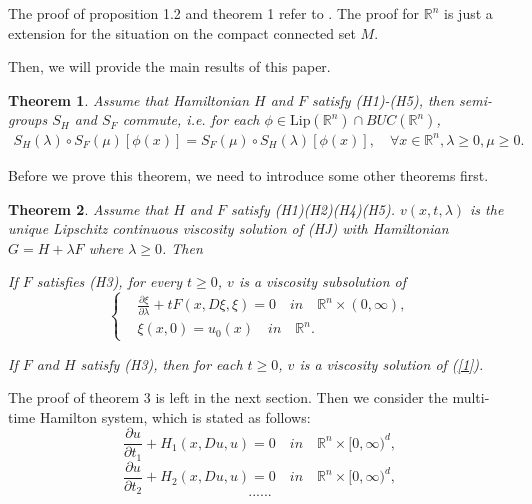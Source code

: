 \documentclass[preprint]{elsarticle}
\newtheorem{result}{\textbf{Theorem}}
\numberwithin{equation}{section}
\begin{document}
The proof of proposition 1.2 and theorem 1 refer to \cite{KLJ}. The proof for $\mathbb R^n$ is just a extension for the situation on the compact connected set $M$. 

Then, we will provide the main results of this paper.

\begin{result}\label{thm2}
     Assume that Hamiltonian $H$ and $F$ satisfy (H1)-(H5), then semi-groups $S_H$ and $S_F$ commute, i.e. for each $\phi \in \text{Lip}(\mathbb R^n)\cap BUC(\mathbb R^n)$, 
     \begin{align}
         S_H(\lambda) \circ S_F(\mu)[\phi(x)]= S_F(\mu) \circ S_H(\lambda)[\phi(x)], \quad\forall x \in \mathbb R^n, \lambda \geq 0, \mu \geq 0.
     \end{align}
\end{result}

Before we prove this theorem, we need to introduce some other theorems first.

\begin{result}\label{thm3}
     Assume that $H$ and $F$ satisfy (H1)(H2)(H4)(H5). $v(x,t,\lambda)$ is the unique Lipschitz continuous viscosity solution of (HJ) with Hamiltonian $G=H+\lambda F$ where $\lambda \geq 0$. Then
     \item[(i)] If $F$ satisfies (H3), for every $t \geq 0$, $v$ is a viscosity subsolution of 
        \begin{equation}
            \left\{
            \begin{aligned}
            & \frac{\partial \xi}{\partial \lambda} +tF(x,D\xi,\xi)=0 \quad in \quad \mathbb R^n \times (0,\infty),
            \\
            &\xi(x,0)=u_0(x) \quad in \quad \mathbb R^n.
            \end{aligned}
            \right.\label{1}
        \end{equation}
    \item[(ii)] If $F$ and $H$ satisfy (H3), then for each $t \geq 0$, $v$ is a viscosity solution of (\ref{1}).  
\end{result}
The proof of theorem 3 is left in the next section. Then we consider the multi-time Hamilton system, which is stated as follows:
\begin{equation}\tag{HJ1}
    \frac{\partial u}{\partial t_1} +H_1(x,Du,u)=0 \quad in \quad \mathbb R^n \times [0,\infty)^d,
\end{equation}
\begin{equation}\tag{HJ2}
    \frac{\partial u}{\partial t_2} +H_2(x,Du,u)=0 \quad in \quad \mathbb R^n \times [0,\infty)^d,
\end{equation}
\begin{equation*}
    ......
\end{equation*}
\end{document}
